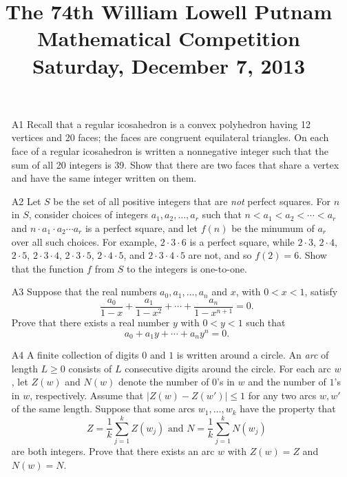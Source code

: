 \documentclass[amssymb,twocolumn,pra,10pt,aps]{revtex4-1}
\begin{document}
\title{The 74th William Lowell Putnam Mathematical Competition \\
    Saturday, December 7, 2013}
\maketitle

\newcommand{\FF}{\mathbb{F}}
\newcommand{\RR}{\mathbb{R}}

\begin{itemize}

\item[A1] 
Recall that a regular icosahedron is a convex polyhedron
having 12 vertices and 20 faces;
the faces are congruent equilateral triangles.
On each face of a regular icosahedron is written a nonnegative integer
such that the sum of all 20 integers is 39. Show that there are 
two faces that share a vertex and have the same integer written on them.

\item[A2]
Let $S$ be the set of all positive integers that are \emph{not} perfect squares. For $n$ in $S$, consider choices of integers
$a_1, a_2, \dots, a_r$ such that $n < a_1<  a_2 < \cdots < a_r$
and $n \cdot a_1 \cdot a_2 \cdots a_r$ is a perfect square, and
let $f(n)$ be the minumum of $a_r$ over all such choices. For example,
$2 \cdot 3 \cdot 6$ is a perfect square, while $2 \cdot 3$, $2 \cdot 4$, 
$2 \cdot 5$, $2 \cdot 3 \cdot 4$, $2 \cdot 3 \cdot 5$, $2 \cdot 4 \cdot 5$, and $2 \cdot 3 \cdot 4 \cdot 5$ are not, and so $f(2) = 6$.
Show that the function $f$ from $S$ to the integers is one-to-one.

\item[A3]
Suppose that the real numbers $a_0, a_1, \dots, a_n$ and
$x$, with $0 < x < 1$, satisfy
\[
\frac{a_0}{1-x} + \frac{a_1}{1-x^2} + \cdots + \frac{a_n}{1 - x^{n+1}} = 0.
\]
Prove that there exists a real number $y$ with $0 < y < 1$ such that
\[
a_0 + a_1 y + \cdots + a_n y^n = 0.
\]

\item[A4]
A finite collection of digits $0$ and $1$ is written around a circle.
An \emph{arc} of length $L \geq 0$ consists of $L$ consecutive digits around the circle. For each arc $w$, let $Z(w)$ and $N(w)$ denote the number of $0$'s in $w$ and the number of $1$'s in $w$, respectively.
Assume that $\left| Z(w) - Z(w') \right| \leq 1$ for any two arcs $w, w'$ of the same length. Suppose that some arcs $w_1,\dots,w_k$ have the property that
\[
Z = \frac{1}{k} \sum_{j=1}^k Z(w_j) \mbox{ and }
N = \frac{1}{k} \sum_{j=1}^k N(w_j)
\]
are both integers. Prove that there exists an arc $w$ with $Z(w) = Z$
and $N(w) = N$.


\end{itemize}
\end{document}
